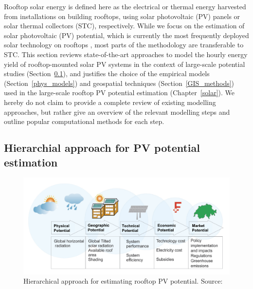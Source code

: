 Rooftop solar energy is defined here as the electrical or thermal energy harvested from installations on building rooftops, using solar photovoltaic (PV) panels or solar thermal collectors (STC), respectively. 
While we focus on the estimation of solar photovoltaic (PV) potential, which is currently the most frequently deployed solar technology on rooftops \cite{kaufmann_schweizerische_2017}, most parts of the methodology
are transferable to STC. 
This section reviews state-of-the-art approaches to model the hourly energy yield of rooftop-mounted solar PV systems in the context of large-scale potential studies (Section~\ref{method_solar_hierarchy}), and justifies the choice of the empirical models (Section~\ref{phys_models}) and geospatial techniques (Section~\ref{GIS_methods})
used in the large-scale rooftop PV potential estimation (Chapter~\ref{solar}). 
We hereby do not claim to provide a complete review of existing modelling approaches, but rather give an overview of the relevant modelling steps and outline popular computational methods for each step.

\subsection{Hierarchial approach for PV potential estimation}
\label{method_solar_hierarchy}
\begin{figure}[tb]
	\centering
	\includegraphics[width=\linewidth]{images/Figs/hierarchy.png}  
	\caption{Hierarchical approach for estimating rooftop PV potential. Source: \citet{assouline_estimation_2017}}
	\label{fig:solar_hierarchy}
\end{figure}

